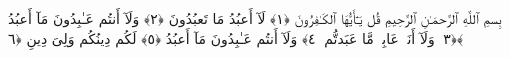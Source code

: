 
  
    
  
    
    

\nopagebreak
  بِسمِ ٱللَّهِ ٱلرَّحمَـٰنِ ٱلرَّحِيمِ
  قُل يَـٰٓأَيُّهَا ٱلكَـٰفِرُونَ ﴿١﴾
 لَآ أَعبُدُ مَا تَعبُدُونَ ﴿٢﴾
 وَلَآ أَنتُم عَـٰبِدُونَ مَآ أَعبُدُ ﴿٣﴾
 وَلَآ أَنَا۠ عَابِدٌۭ مَّا عَبَدتُّم ﴿٤﴾
 وَلَآ أَنتُم عَـٰبِدُونَ مَآ أَعبُدُ ﴿٥﴾
 لَكُم دِينُكُم وَلِىَ دِينِ ﴿٦﴾
 
